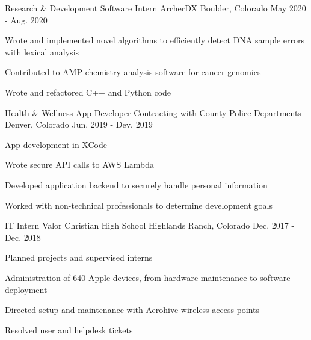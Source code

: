 \begin{cventries}
  \cventry
    {Research \& Development Software Intern}
    {ArcherDX}
    {Boulder, Colorado}
    {May 2020 - Aug. 2020}
    {
      \begin{cvitems}
        \item {Wrote and implemented novel algorithms to efficiently detect DNA sample errors with lexical analysis}
        \item {Contributed to AMP chemistry analysis software for cancer genomics}
        \item {Wrote and refactored C++ and Python code}
      \end{cvitems}
    }

  \cventry
    {Health \& Wellness App Developer}
    {Contracting with County Police Departments}
    {Denver, Colorado}
    {Jun. 2019 - Dev. 2019}
    {
      \begin{cvitems}
        \item {App development in XCode}
        \item {Wrote secure API calls to AWS Lambda}
        \item {Developed application backend to securely handle personal information}
        \item {Worked with non-technical professionals to determine development goals}
      \end{cvitems}
    }

  \cventry
    {IT Intern}
    {Valor Christian High School}
    {Highlands Ranch, Colorado}
    {Dec. 2017 - Dec. 2018}
    {
      \begin{cvitems}
        \item {Planned projects and supervised interns}
        \item {Administration of 640 Apple devices, from hardware maintenance to software deployment}
        \item {Directed setup and maintenance with Aerohive wireless access points}
        \item {Resolved user and helpdesk tickets}
      \end{cvitems}
    }

\end{cventries}
